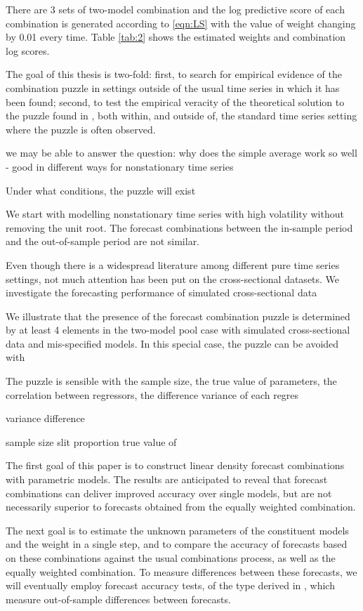 \documentclass{monashthesis}
\begin{document}
There are 3 sets of two-model combination and the log predictive score of each combination is generated according to \ref{eqn:LS} with the value of weight changing by 0.01 every time. Table \ref{tab:2} shows the estimated weights and combination log scores.

The goal of this thesis is two-fold: first, to search for empirical evidence of the combination puzzle in settings outside of the usual time series in which it has been found; second, to test the empirical veracity of the theoretical solution to the puzzle found in \textcite{FZMP23}, both within, and outside of, the standard time series setting where the puzzle is often observed.

we may be able to answer the question: why does the simple average work so well - good in different ways for nonstationary time series

Under what conditions, the puzzle will exist

We start with modelling nonstationary time series with high volatility without removing the unit root. The forecast combinations between the in-sample period and the out-of-sample period are not similar.

Even though there is a widespread literature among different pure time series settings, not much attention has been put on the cross-sectional datasets. We investigate the forecasting performance of simulated cross-sectional data

We illustrate that the presence of the forecast combination puzzle is determined by at least 4 elements in the two-model pool case with simulated cross-sectional data and mis-specified models. In this special case, the puzzle can be avoided with

The puzzle is sensible with the sample size, the true value of parameters, the correlation between regressors, the difference variance of each regres

variance difference

sample size
slit proportion
true value of

The first goal of this paper is to construct linear density forecast combinations with parametric models. The results are anticipated to reveal that forecast combinations can deliver improved accuracy over single models, but are not necessarily superior to forecasts obtained from the equally weighted combination.

The next goal is to estimate the unknown parameters of the constituent models and the weight in a single step, and to compare the accuracy of forecasts based on these combinations against the usual combinations process, as well as the equally weighted combination. To measure differences between these forecasts, we will eventually employ forecast accuracy tests, of the type derived in \textcite{W96}, which measure out-of-sample differences between forecasts.
\end{document}
